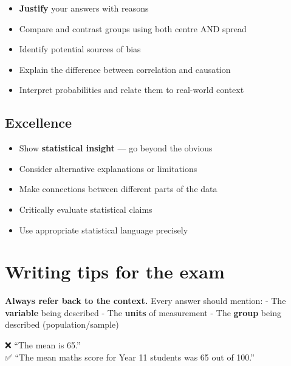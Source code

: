 \documentclass[
  11pt,
  a4paper,
  oneside,
  open=any]{scrbook}
\providecommand{\tightlist}{%
  \setlength{\itemsep}{0pt}\setlength{\parskip}{0pt}}
\begin{document}
\begin{itemize}
\tightlist
\item
  \textbf{Justify} your answers with reasons
\item
  Compare and contrast groups using both centre AND spread
\item
  Identify potential sources of bias
\item
  Explain the difference between correlation and causation
\item
  Interpret probabilities and relate them to real-world context
\end{itemize}

\subsection{Excellence}\label{excellence}

\begin{itemize}
\tightlist
\item
  Show \textbf{statistical insight} --- go beyond the obvious
\item
  Consider alternative explanations or limitations
\item
  Make connections between different parts of the data
\item
  Critically evaluate statistical claims
\item
  Use appropriate statistical language precisely
\end{itemize}

\section{Writing tips for the exam}\label{writing-tips-for-the-exam}

\begin{tcolorbox}[enhanced jigsaw, breakable, leftrule=.75mm, bottomtitle=1mm, bottomrule=.15mm, titlerule=0mm, left=2mm, opacitybacktitle=0.6, coltitle=black, colbacktitle=quarto-callout-tip-color!10!white, rightrule=.15mm, title=\textcolor{quarto-callout-tip-color}{\faLightbulb}\hspace{0.5em}{The golden rule}, toptitle=1mm, arc=.35mm, colback=white, toprule=.15mm, colframe=quarto-callout-tip-color-frame, opacityback=0]

\textbf{Always refer back to the context.} Every answer should mention:
- The \textbf{variable} being described - The \textbf{units} of
measurement - The \textbf{group} being described (population/sample)

❌ ``The mean is 65.''\\
✅ ``The mean maths score for Year 11 students was 65 out of 100.''

\end{tcolorbox}
\end{document}
